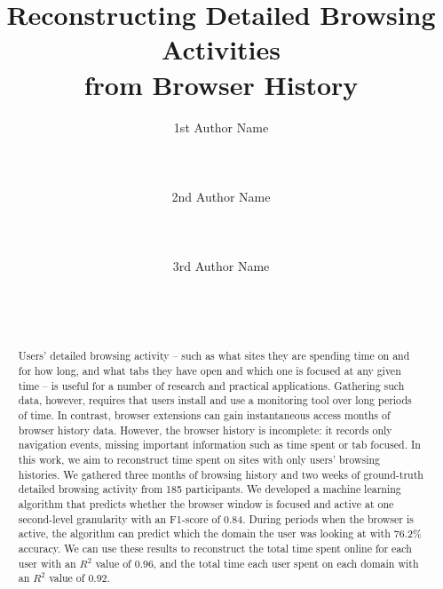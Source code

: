 \documentclass{sigchi}
\begin{document}
\title{Reconstructing Detailed Browsing Activities\\from Browser History}

\author{
  \alignauthor 1st Author Name\\
    \\
    \\
    \\
  \alignauthor 2nd Author Name\\
    \\
    \\
    \\
  \alignauthor 3rd Author Name\\
    \\
    \\
    \\
}

\maketitle

\begin{abstract}
Users' detailed browsing activity -- such as what sites they are spending time on and for how long, and what tabs they have open and which one is focused at any given time -- is useful for a number of research and practical applications. Gathering such data, however, requires that users install and use a monitoring tool over long periods of time. In contrast, browser extensions can gain instantaneous access months of browser history data. However, the browser history is incomplete: it records only navigation events, missing important information such as time spent or tab focused. In this work, we aim to reconstruct time spent on sites with only users' browsing histories. We gathered three months of browsing history and two weeks of ground-truth detailed browsing activity from 185 participants. We developed a machine learning algorithm that predicts whether the browser window is focused and active at one second-level granularity with an F1-score of 0.84. During periods when the browser is active, the algorithm can predict which the domain the user was looking at with 76.2\% accuracy. We can use these results to reconstruct the total time spent online for each user with an $R^2$ value of 0.96, and the total time each user spent on each domain with an $R^2$ value of 0.92.
\end{abstract}
\end{document}
